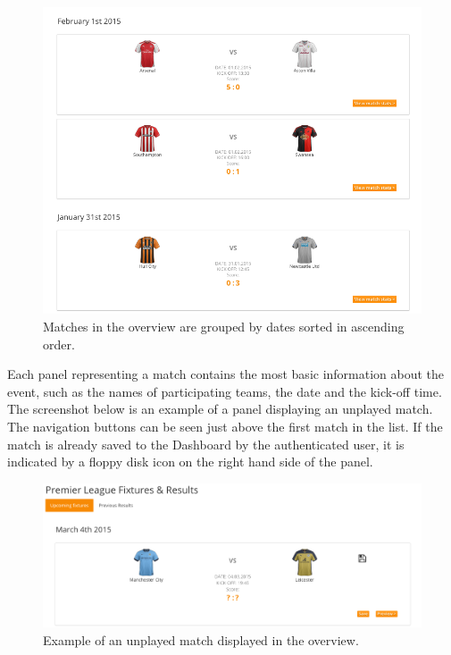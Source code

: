 \begin{figure}[H]
	\begin{center}
		\includegraphics[width=.90\textwidth]{impl/images/matchesGrouped}
		\caption{Matches in the overview are grouped by dates sorted in ascending order.} \label{fig:using:matchesgrouped}
	\end{center}
\end{figure}
Each panel representing a match contains the most basic information about the event, such as the names of participating teams, the date and the kick-off time. The screenshot below is an example of a panel displaying an unplayed match. The navigation buttons can be seen just above the first match in the list. If the match is already saved to the Dashboard by the authenticated user, it is indicated by a floppy disk icon on the right hand side of the panel.

\begin{figure}[H]
	\begin{center}
		\includegraphics[width=.90\textwidth]{impl/images/unplayedMatch}
		\caption{Example of an unplayed match displayed in the overview.} \label{fig:using:unplayedmatch}
	\end{center}
\end{figure}

